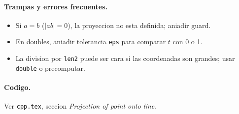 \paragraph{Trampas y errores frecuentes.}
\begin{itemize}\setlength\itemsep{0pt}
	\item Si $a = b$ ($|ab| = 0$), la proyeccion no esta definida; aniadir guard.
	\item En doubles, aniadir tolerancia \texttt{eps} para comparar $t$ con 0 o 1.
	\item La division por \texttt{len2} puede ser cara si las coordenadas son grandes; usar \texttt{double} o precomputar.
\end{itemize}

\paragraph{Codigo.}
Ver \texttt{cpp.tex}, seccion \textit{Projection of point onto line}.

\vspace{0.5em}
